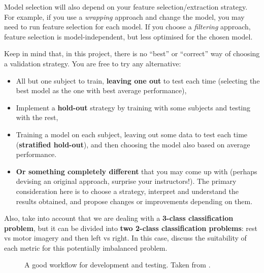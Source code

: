 \documentclass[11pt]{exam}
\begin{document}
\begin{itemize}
        Model selection will also depend on your feature selection/extraction strategy. For example, if you use a \emph{wrapping} approach and change the model, you may need to run feature selection for each model. If you choose a \emph{filtering} approach, feature selection is model-independent, but less optimised for the chosen model.

        Keep in mind that, in this project, there is no “best” or “correct” way of choosing a validation strategy. You are free to try any alternative:
        \begin{itemize}
            \item All but one subject to train, \textbf{leaving one out} to test each time (selecting the best model as the one with best average performance),
            \item Implement a \textbf{hold-out} strategy by training with some subjects and testing with the rest,
            \item Training a model on each subject, leaving out some data to test each time (\textbf{stratified hold-out}), and then choosing the model also based on average performance.
            \item \textbf{Or something completely different} that you may come up with (perhaps devising an original approach, surprise your instructors!).
            The primary consideration here is to choose a strategy, interpret and understand the results obtained, and propose changes or improvements depending on them.
        \end{itemize}
        Also, take into account that we are dealing with a \textbf{3-class classification problem}, but it can be divided into \textbf{two 2-class classification problems}: rest vs motor imagery and then left vs right. In this case, discuss the suitability of each metric for this potentially imbalanced problem.
    \end{itemize}

    \begin{figure}[htbp]
        \centering
        \caption{A good workflow for development and testing. Taken from \href{https://developers.google.com/machine-learning/crash-course/overfitting/dividing-datasets}{}.}
    \end{figure}
\end{document}
